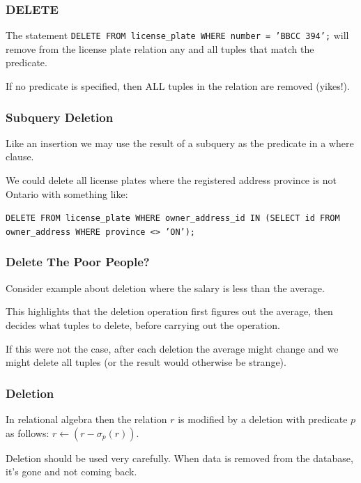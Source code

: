 \begin{frame}
\frametitle{DELETE}

The statement \texttt{DELETE FROM license\_plate WHERE number = 'BBCC 394';} will remove from the license plate relation any and all tuples that match the predicate. 

If no predicate is specified, then ALL tuples in the relation are removed (yikes!).

\end{frame}



\begin{frame}
\frametitle{Subquery Deletion}


Like an insertion we may use the result of a subquery as the predicate in a where clause. 

We could delete all license plates where the registered address province is not Ontario with something like: 

\texttt{DELETE FROM license\_plate WHERE owner\_address\_id IN (SELECT id FROM owner\_address WHERE province <> 'ON');}

\end{frame}



\begin{frame}
\frametitle{Delete The Poor People?}

Consider example about deletion where the salary is less than the average. 

This highlights that the deletion operation first figures out the average, then decides what tuples to delete, before carrying out the operation. 

If this were not the case, after each deletion the average might change and we might delete all tuples (or the result would otherwise be strange). 


\end{frame}



\begin{frame}
\frametitle{Deletion}


In relational algebra then the relation $r$ is modified by a deletion with predicate $p$ as follows: $r \leftarrow (r - \sigma_{p}( r ) )$.

Deletion should be used very carefully. When data is removed from the database, it's gone and not coming back.


\end{frame}



